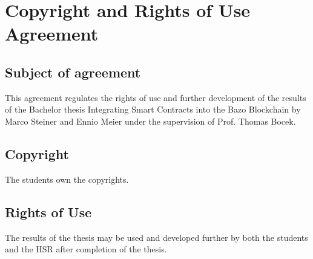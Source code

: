 \chapter{Copyright and Rights of Use Agreement}
\section{Subject of agreement}
This agreement regulates the rights of use and further development of the results of the Bachelor thesis \flqq Integrating Smart Contracts into the Bazo Blockchain\frqq{} by Marco Steiner and Ennio Meier under the supervision of Prof. Thomas Bocek.

\section{Copyright}
The students own the copyrights.

\section{Rights of Use}
The results of the thesis may be used and developed further by both the students and the HSR after completion of the thesis.
